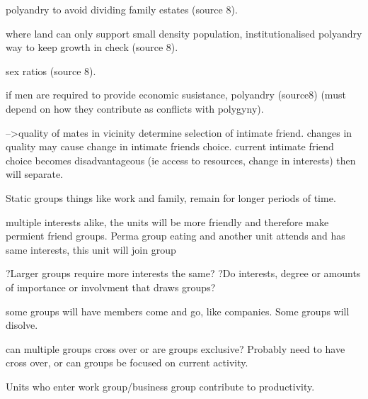 polyandry to avoid dividing family estates (source 8).

where land can only support small density population, institutionalised polyandry way to keep growth in check (source 8).

sex ratios (source 8).

if men are required to provide economic susistance, polyandry (source8) (must depend on how they contribute as conflicts with polygyny).  

-->quality of mates in vicinity determine selection of intimate friend. changes in quality may cause change in intimate friends choice. current intimate friend choice becomes disadvantageous (ie access to resources, change in interests) then will separate.





Static groups things like work and family, remain for longer periods of time.

multiple interests alike, the units will be more friendly and therefore make permient friend groups.
Perma group eating and another unit attends and has same interests, this unit will join group

?Larger groups require more interests the same?
?Do interests, degree or amounts of importance or involvment that draws groups?

some groups will have members come and go, like companies. 
Some groups will disolve.

can multiple groups cross over or are groups exclusive? Probably need to have cross over, or can groups be focused on current activity.


Units who enter work group/business group contribute to productivity. 




